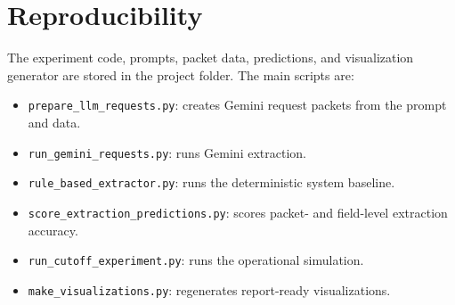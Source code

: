 \documentclass[11pt]{article}
\begin{document}
\section{Reproducibility}

The experiment code, prompts, packet data, predictions, and visualization generator are stored in the project folder. The main scripts are:

\begin{itemize}
  \item \texttt{prepare\_llm\_requests.py}: creates Gemini request packets from the prompt and data.
  \item \texttt{run\_gemini\_requests.py}: runs Gemini extraction.
  \item \texttt{rule\_based\_extractor.py}: runs the deterministic system baseline.
  \item \texttt{score\_extraction\_predictions.py}: scores packet- and field-level extraction accuracy.
  \item \texttt{run\_cutoff\_experiment.py}: runs the operational simulation.
  \item \texttt{make\_visualizations.py}: regenerates report-ready visualizations.
\end{itemize}
\end{document}
